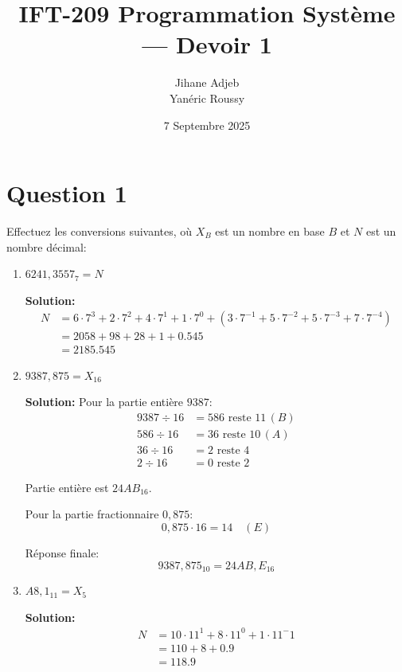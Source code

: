 \documentclass{article}
\title{IFT-209 Programmation Système — Devoir 1}
\author{Jihane Adjeb \\ Yanéric Roussy}
\date{7 Septembre 2025}
\begin{document}
\maketitle

\section*{Question 1}
Effectuez les conversions suivantes, où $X_B$ est un nombre en base $B$ et $N$ est un
nombre décimal:

\begin{enumerate}[label=\alph*), itemsep=2em]
    \item $6241,3557_{7} = N$
    
    \textbf{Solution:}
    \[
    \begin{aligned}
    N &= 6 \cdot 7^3 + 2 \cdot 7^2 + 4 \cdot 7^1 + 1 \cdot 7^0 + \left(3 \cdot 7^{-1} + 5 \cdot 7^{-2} + 5 \cdot 7^{-3} + 7 \cdot 7^{-4}\right) \\
    &= 2058 + 98 + 28 + 1 + 0.545 \\
    &= 2185.545
    \end{aligned}
    \]

    \item $9387,875 = X_{16}$
    
    \textbf{Solution:}
    Pour la partie entière $9387$:
    \[
    \begin{aligned}
    9387 \div 16 &= 586 \text{ reste } 11 \, (B) \\
    586 \div 16 &= 36 \text{ reste } 10 \, (A) \\
    36 \div 16 &= 2 \text{ reste } 4 \\
    2 \div 16 &= 0 \text{ reste } 2
    \end{aligned}
    \]

    Partie entière est $24AB_{16}$.

    Pour la partie fractionnaire $0,875$:
    \[
    0,875 \cdot 16 = 14 \quad (E)
    \]
    
    Réponse finale:
    \[
    9387,875_{10} = 24AB,E_{16}
    \]

    \newpage

    \item $A8,1_{11} = X_{5}$
    
    \textbf{Solution:}
    \[
    \begin{aligned}
    N &= 10 \cdot 11^1 + 8 \cdot 11^0 + 1 \cdot 11^-1 \\
    &= 110 + 8 + 0.9 \\
    &= 118.9
    \end{aligned}
    \]
    

\end{enumerate}
\end{document}
